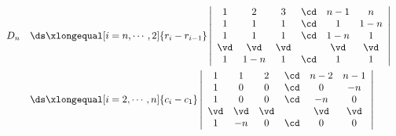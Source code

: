 \begin{jie}
$$
\begin{array}{ll}
  D_n &  \ds 
        \xlongequal[i=n,\cdots,2]{r_i-r_{i-1}} 
        \left|
        \begin{array}{cccccc}
          1   &  2 &  3 & \cd &  n-1 & n\\
          1   &  1 &  1 & \cd &   1  & 1-n \\
          1   &  1 &  1 & \cd &  1-n  & 1\\
          \vd & \vd & \vd&     & \vd  & \vd \\
          1   & 1-n &  1 & \cd &   1   & 1
        \end{array}
                                         \right| \\[1.0cm]
      & \ds 
        \xlongequal[i=2,\cdots,n]{c_i-c_1} 
        \left|
        \begin{array}{cccccc}
          1   &  1 &  2 & \cd &  n-2 & n-1\\
          1   &  0 &  0 & \cd &   0  & -n \\
          1   &  0 &  0 & \cd &  -n  & 0\\
          \vd & \vd & \vd&     & \vd  & \vd \\
          1   & -n &  0 & \cd &   0   & 0
        \end{array}
                                        \right|
\end{array}
$$








\end{jie}
